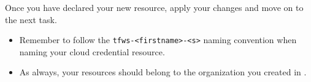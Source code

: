Once you have declared your new resource, apply your changes and move on to the next task.

\begin{warn}
  \begin{itemize}
    \item Remember to follow the \texttt{tfws-<firstname>-<s>} naming convention when naming your cloud credential resource.
    \item As always, your resources should belong to the organization you created in .
  \end{itemize}
\end{warn}

